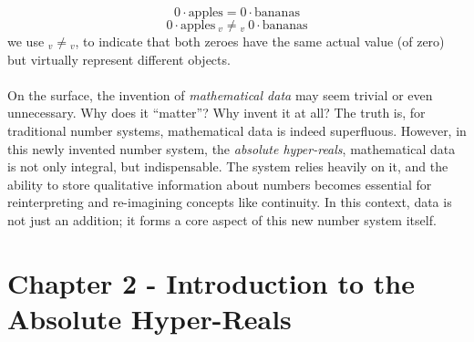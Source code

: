 \documentclass{article}
\begin{document}
$$0\cdot \text{apples}=0\cdot \text{bananas}$$ $$0\cdot \text{apples} \ _v{\neq}{}_v \ 0\cdot \text{bananas}$$  we use $_v{\neq}{}_v$, to indicate that both zeroes have the same actual value (of zero) but virtually represent different objects.\\\\On the surface, the invention of \emph{mathematical data} may seem trivial or even unnecessary. Why does it ``matter''? Why invent it at all? The truth is, for traditional number systems, mathematical data is indeed superfluous. However, in this newly invented number system, the \emph{absolute hyper-reals}, mathematical data is not only integral, but indispensable. The system relies heavily on it, and the ability to store qualitative information about numbers becomes essential for reinterpreting and re-imagining concepts like continuity. In this context, data is not just an addition; it forms a core aspect of this new number system itself.
\newpage
\section{Chapter 2 - Introduction to the Absolute Hyper-Reals}
\end{document}
